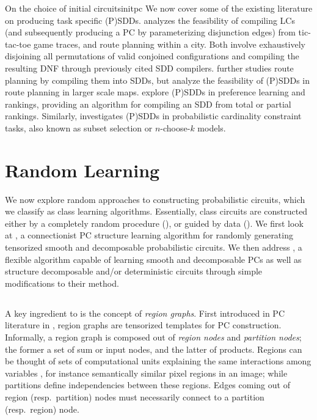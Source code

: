 \begin{remark}[breakable]{On the choice of initial circuits}{initpc}
  We now cover some of the existing literature on producing task specific (P)SDDs. \citet{choi16}
  analyzes the feasibility of compiling LCs (and subsequently producing a PC by parameterizing
  disjunction edges) from tic-tac-toe game traces, and route planning within a city. Both involve
  exhaustively disjoining all permutations of valid conjoined configurations and compiling the
  resulting DNF through previously cited SDD compilers. \citet{choi17} further studies route
  planning by compiling them into SDDs, but analyze the feasibility of (P)SDDs in route planning in
  larger scale maps. \citet{choi15} explore (P)SDDs in preference learning and rankings, providing
  an algorithm for compiling an SDD from total or partial rankings. Similarly, \citet{shen17}
  investigates (P)SDDs in probabilistic cardinality constraint tasks, also known as subset
  selection or $n$-choose-$k$ models.
\end{remark}

\section{Random Learning}
\label{sec:random}

We now explore random approaches to constructing probabilistic circuits, which we classify as
\randclass{} class learning algorithms. Essentially, \randclass{} class circuits are constructed
either by a completely random procedure (), or guided by data ().
We first look at  \citep{peharz20a}, a connectionist PC structure learning
algorithm for randomly generating tensorized smooth and decomposable probabilistic circuits. We
then address  \citep{dimauro21}, a flexible algorithm capable of learning smooth and
decomposable PCs as well as structure decomposable and/or deterministic circuits through simple
modifications to their method.

\subsection{}
\label{sec:ratspn}

A key ingredient to  \citep{peharz20a} is the concept of \emph{region graphs}.
First introduced in PC literature in \citet{dennis12}, region graphs are tensorized templates for
PC construction. Informally, a region graph is composed out of \emph{region nodes} and
\emph{partition nodes}; the former a set of sum or input nodes, and the latter of products. Regions
can be thought of sets of computational units explaining the same interactions among variables
\citep{dennis12}, for instance semantically similar pixel regions in an image; while partitions
define independencies between these regions. Edges coming out of region (resp.\ partition) nodes
must necessarily connect to a partition (resp.\ region) node.

